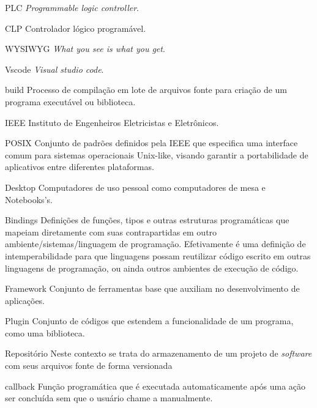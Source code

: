 \listoffigures*
\cleardoublepage

\listoftables*
\cleardoublepage

\listoflistings
\cleardoublepage

\begin{siglas}												%
    \item[PLC]               \textit{Programmable logic controller}.
    \item[CLP]               Controlador lógico programável.
    \item[WYSIWYG]           \textit{What you see is what you get}.
    \item[Vscode]            \textit{Visual studio code}.
    \item[build]             Processo de compilação em lote de arquivos fonte para criação de um programa executável ou biblioteca.
    \item[IEEE]              Instituto de Engenheiros Eletricistas e Eletrônicos.
    \item[POSIX]             Conjunto de padrões definidos pela IEEE que especifica uma interface comum para sistemas operacionais Unix-like, visando garantir a portabilidade de aplicativos entre diferentes plataformas.
    \item[Desktop]           Computadores de uso pessoal como computadores de mesa e Notebooks's.
    \item[Bindings]          Definições de funções, tipos e outras estruturas programáticas que mapeiam diretamente com suas contrapartidas em outro ambiente/sistemas/linguagem de programação. Efetivamente é uma definição de intemperabilidade para que linguagens possam reutilizar código escrito em outras linguagens de programação, ou ainda outros ambientes de execução de código.
    \item[Framework]         Conjunto de ferramentas base que auxiliam no desenvolvimento de aplicações.
    \item[Plugin]            Conjunto de códigos que estendem a funcionalidade de um programa, como uma biblioteca.
    \item[Repositório]       Neste contexto se trata do armazenamento de um projeto de \textit{software} com seus arquivos fonte de forma versionada 
    \item[callback]          Função programática que é executada automaticamente após uma ação ser concluída sem que o usuário chame a manualmente. 

\end{siglas}

